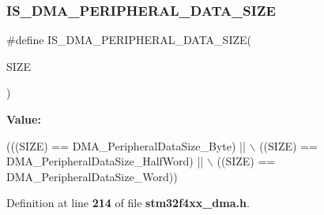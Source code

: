 \subsubsection{I\+S\+\_\+\+D\+M\+A\+\_\+\+P\+E\+R\+I\+P\+H\+E\+R\+A\+L\+\_\+\+D\+A\+T\+A\+\_\+\+S\+I\+ZE}
{\footnotesize\ttfamily \#define I\+S\+\_\+\+D\+M\+A\+\_\+\+P\+E\+R\+I\+P\+H\+E\+R\+A\+L\+\_\+\+D\+A\+T\+A\+\_\+\+S\+I\+ZE(\begin{DoxyParamCaption}\item[{}]{S\+I\+ZE }\end{DoxyParamCaption})}

{\bfseries Value\+:}
\begin{DoxyCode}
(((SIZE) == DMA_PeripheralDataSize_Byte)  || \(\backslash\)
                                           ((SIZE) == 
      DMA_PeripheralDataSize_HalfWord) || \(\backslash\)
                                           ((SIZE) == 
      DMA_PeripheralDataSize_Word))
\end{DoxyCode}


Definition at line \textbf{ 214} of file \textbf{ stm32f4xx\+\_\+dma.\+h}.

